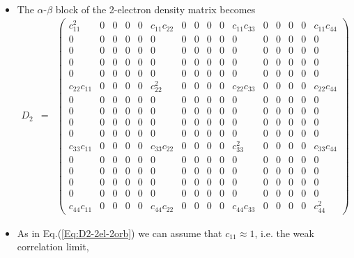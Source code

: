 \documentclass[aip,graphicx]{revtex4-1}
\begin{document}
\begin{itemize}
\begin{eqnarray}
         \end{eqnarray}
\item The $\alpha$-$\beta$ block of the 2-electron density matrix becomes
         \setcounter{MaxMatrixCols}{16}
         \begin{eqnarray}
         \label{Eq:D2-2el-4orb}
         D_{2} &=&
         \begin{pmatrix}
         c_{11}^2 & 0 & 0 & 0 & 0 & c_{11}c_{22} & 0 & 0 & 0 & 0 & c_{11}c_{33} & 0 & 0 & 0 & 0 & c_{11}c_{44} \\
         0 & 0 & 0 & 0 &  0 & 0 & 0 & 0  & 0 & 0 & 0 & 0 &  0 & 0 & 0 & 0 \\
         0 & 0 & 0 & 0 &  0 & 0 & 0 & 0  & 0 & 0 & 0 & 0 &  0 & 0 & 0 & 0 \\
         0 & 0 & 0 & 0 &  0 & 0 & 0 & 0  & 0 & 0 & 0 & 0 &  0 & 0 & 0 & 0 \\
         0 & 0 & 0 & 0 &  0 & 0 & 0 & 0  & 0 & 0 & 0 & 0 &  0 & 0 & 0 & 0 \\
         c_{22}c_{11} & 0 & 0 & 0 & 0 & c_{22}^2 & 0 & 0 & 0 & 0 & c_{22}c_{33} & 0 & 0 & 0 & 0 & c_{22}c_{44} \\
         0 & 0 & 0 & 0 &  0 & 0 & 0 & 0  & 0 & 0 & 0 & 0 &  0 & 0 & 0 & 0 \\
         0 & 0 & 0 & 0 &  0 & 0 & 0 & 0  & 0 & 0 & 0 & 0 &  0 & 0 & 0 & 0 \\
         0 & 0 & 0 & 0 &  0 & 0 & 0 & 0  & 0 & 0 & 0 & 0 &  0 & 0 & 0 & 0 \\
         0 & 0 & 0 & 0 &  0 & 0 & 0 & 0  & 0 & 0 & 0 & 0 &  0 & 0 & 0 & 0 \\
         c_{33}c_{11} & 0 & 0 & 0 & 0 & c_{33}c_{22} & 0 & 0 & 0 & 0 & c_{33}^2 & 0 & 0 & 0 & 0 & c_{33}c_{44} \\
         0 & 0 & 0 & 0 &  0 & 0 & 0 & 0  & 0 & 0 & 0 & 0 &  0 & 0 & 0 & 0 \\
         0 & 0 & 0 & 0 &  0 & 0 & 0 & 0  & 0 & 0 & 0 & 0 &  0 & 0 & 0 & 0 \\
         0 & 0 & 0 & 0 &  0 & 0 & 0 & 0  & 0 & 0 & 0 & 0 &  0 & 0 & 0 & 0 \\
         0 & 0 & 0 & 0 &  0 & 0 & 0 & 0  & 0 & 0 & 0 & 0 &  0 & 0 & 0 & 0 \\
         c_{44}c_{11} & 0 & 0 & 0 & 0 & c_{44}c_{22} & 0 & 0 & 0 & 0 & c_{44}c_{33} & 0 & 0 & 0 & 0 & c_{44}^2 
         \end{pmatrix}
         \end{eqnarray}
\item As in Eq.(\ref{Eq:D2-2el-2orb}) we can assume that $c_{11} \approx 1$, i.e. the weak correlation limit,

\end{itemize}
\end{document}
